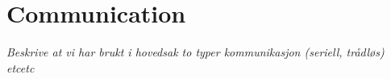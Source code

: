 \section{Communication}
\textit{Beskrive at vi har brukt i hovedsak to typer kommunikasjon (seriell, trådløs) etcetc}


%